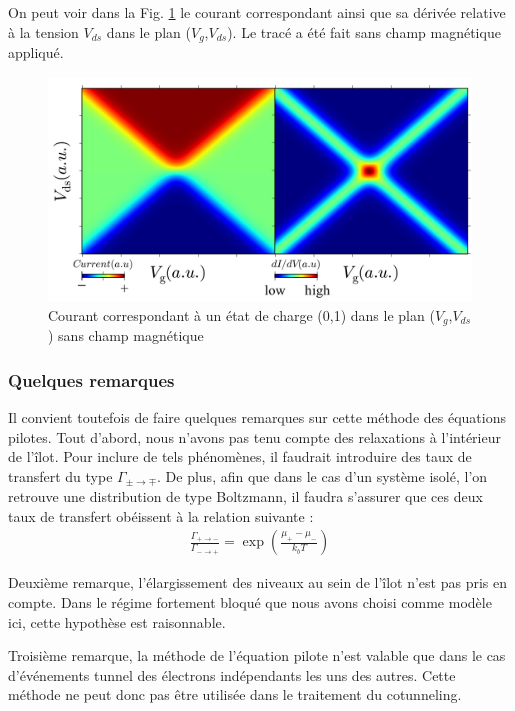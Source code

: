 On peut voir dans la Fig. \ref{SimulatedCoulombMap} le courant correspondant ainsi que sa dérivée relative à la tension $V_{ds}$ dans le plan ($V_g$,$V_{ds}$). Le tracé a été fait sans champ magnétique appliqué.


\begin{figure}
\begin{center}
\includegraphics[scale=0.5]{Annexe3/figure1/figure4.pdf} 
\caption{Courant correspondant à un état de charge (0,1) dans le plan ($V_g$,$V_{ds}$) sans champ magnétique}
\label{SimulatedCoulombMap}
\end{center}
\end{figure}

\subsubsection{Quelques remarques}
Il convient toutefois de faire quelques remarques sur cette méthode des équations pilotes. Tout d'abord, nous n'avons pas tenu compte des relaxations à l'intérieur de l'\^ilot. Pour inclure de tels phénomènes, il faudrait introduire des taux de transfert du type $\Gamma_{\pm \rightarrow \mp}$. De plus, afin que dans le cas d'un système isolé, l'on retrouve une distribution de type Boltzmann, il faudra s'assurer que ces deux taux de transfert obéissent à la relation suivante :
\begin{eqnarray}
\frac{\Gamma_{+ \rightarrow -}}{\Gamma_{- \rightarrow +}} = \exp(\frac{\mu_{+}- \mu_{-}}{k_bT}) \nonumber
\end{eqnarray}

Deuxième remarque, l'élargissement des niveaux au sein de l'\^ilot n'est pas pris en compte. Dans le régime fortement bloqué que nous avons choisi comme modèle ici, cette hypothèse est raisonnable. 

Troisième remarque, la méthode de l'équation pilote n'est valable que dans le cas d’événements tunnel des électrons indépendants les uns des autres. Cette méthode ne peut donc pas \^etre utilisée dans le traitement du cotunneling.
